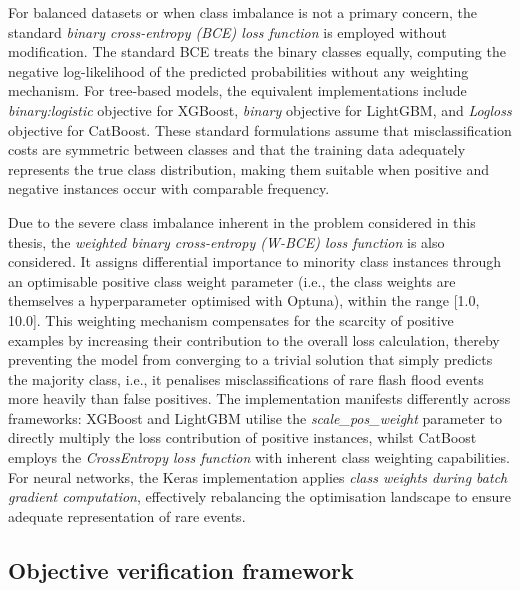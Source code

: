 For  balanced datasets or when class imbalance is not a primary concern, the standard \textit{binary cross-entropy (BCE) loss function} is employed without modification. The standard BCE treats the binary classes equally, computing the negative log-likelihood of the predicted probabilities without any weighting mechanism. For tree-based models, the equivalent implementations include \textit{binary:logistic} objective for XGBoost, \textit{binary} objective for LightGBM, and \textit{Logloss} objective for CatBoost. These standard formulations assume that misclassification costs are symmetric between classes and that the training data adequately represents the true class distribution, making them suitable when positive and negative instances occur with comparable frequency.

Due  to the severe class imbalance inherent in the problem considered in this thesis, the \textit{weighted binary cross-entropy (W-BCE) loss function} is also considered. It assigns differential importance to minority class instances through an optimisable positive class weight parameter (i.e., the class weights are themselves a hyperparameter optimised with Optuna), within the range [1.0, 10.0]. This weighting mechanism compensates for the scarcity of positive examples by increasing their contribution to the overall loss calculation, thereby preventing the model from converging to a trivial solution that simply predicts the majority class, i.e., it penalises misclassifications of rare flash flood events more heavily than false positives. The implementation manifests differently across frameworks: XGBoost and LightGBM utilise the \textit{scale\_pos\_weight} parameter to directly multiply the loss contribution of positive instances, whilst CatBoost employs the \textit{CrossEntropy loss function} with inherent class weighting capabilities. For neural networks, the Keras implementation applies \textit{class weights during batch gradient computation}, effectively rebalancing the optimisation landscape to ensure adequate representation of rare events.


\subsection{Objective verification framework}
\label{data_driven_flash_floods_short_medium_range_data_methods_verif_scores}

